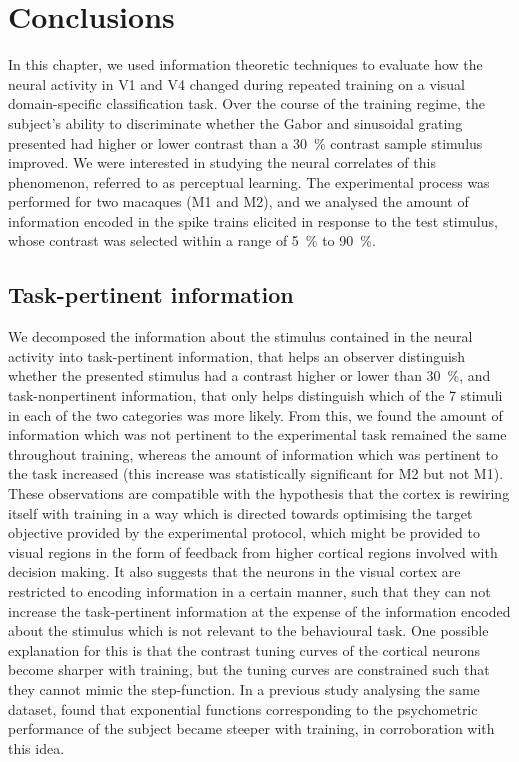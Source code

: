 \section{Conclusions}

In this chapter, we used information theoretic techniques to evaluate how the neural activity in \ac{V1} and \ac{V4} changed during repeated training on a visual domain-specific classification task.
Over the course of the training regime, the subject's ability to discriminate whether the Gabor and sinusoidal grating presented had higher or lower contrast than a \SI{30}{\percent} contrast sample stimulus improved.
We were interested in studying the neural correlates of this phenomenon, referred to as perceptual learning.
The experimental process was performed for two macaques (\ac{M1} and \ac{M2}), and we analysed the amount of information encoded in the spike trains elicited in response to the test stimulus, whose contrast was selected within a range of \SI{5}{\percent} to \SI{90}{\percent}.


\subsection{Task-pertinent information}

We decomposed the information about the stimulus contained in the neural activity into task-pertinent information, that helps an observer distinguish whether the presented stimulus had a contrast higher or lower than \SI{30}{\percent}, and task-nonpertinent information, that only helps distinguish which of the \num{7} stimuli in each of the two categories was more likely.
From this, we found the amount of information which was not pertinent to the experimental task remained the same throughout training, whereas the amount of information which was pertinent to the task increased (this increase was statistically significant for \ac{M2} but not \ac{M1}).
These observations are compatible with the hypothesis that the cortex is rewiring itself with training in a way which is directed towards optimising the target objective provided by the experimental protocol, which might be provided to visual regions in the form of feedback from higher cortical regions involved with decision making.
It also suggests that the neurons in the visual cortex are restricted to encoding information in a certain manner, such that they can not increase the task-pertinent information at the expense of the information encoded about the stimulus which is not relevant to the behavioural task.
One possible explanation for this is that the contrast tuning curves of the cortical neurons become sharper with training, but the tuning curves are constrained such that they cannot mimic the step-function.
In a previous study analysing the same dataset, \citet{Chen2013} found that exponential functions corresponding to the psychometric performance of the subject became steeper with training, in corroboration with this idea.


